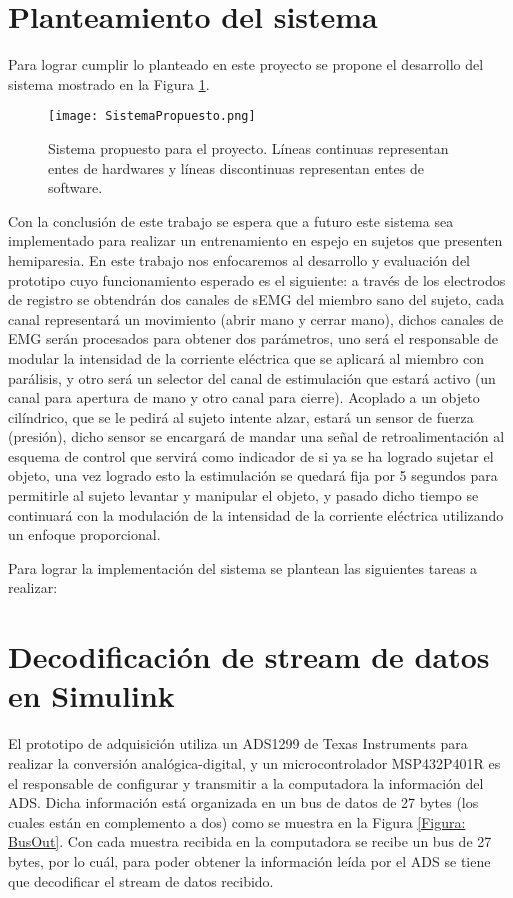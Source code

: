 \section{{\color{red}Planteamiento del sistema}}
Para lograr cumplir lo planteado en este proyecto se propone el desarrollo del sistema mostrado en la Figura \ref{Figura: SistProp}.

\begin{figure}[htbp]
\centering
	\texttt{[image: SistemaPropuesto.png]}
	\caption{Sistema propuesto para el proyecto. Líneas continuas representan entes de hardwares y líneas discontinuas representan entes de software.}
	\label{Figura: SistProp}
\end{figure}

Con la conclusión de este trabajo se espera que a futuro este sistema sea implementado para realizar un entrenamiento en espejo en sujetos que presenten hemiparesia. En este trabajo nos enfocaremos al desarrollo y evaluación del prototipo cuyo funcionamiento esperado es el siguiente: a través de los electrodos de registro se obtendrán dos canales de sEMG del miembro sano del sujeto, cada canal representará un movimiento (abrir mano y cerrar mano), dichos canales de EMG serán procesados para obtener dos parámetros, uno será el responsable de modular la intensidad de la corriente eléctrica que se aplicará al miembro con parálisis, y otro será un selector del canal de estimulación que estará activo (un canal para apertura de mano y otro canal para cierre). Acoplado a un objeto cilíndrico, que se le pedirá al sujeto intente alzar, estará un sensor de fuerza (presión), dicho sensor se encargará de mandar una señal de retroalimentación al esquema de control que servirá como indicador de si ya se ha logrado sujetar el objeto, una vez logrado esto la estimulación se quedará fija por 5 segundos para permitirle al sujeto levantar y manipular el objeto, y pasado dicho tiempo se continuará con la modulación de la intensidad de la corriente eléctrica utilizando un enfoque proporcional.

Para lograr la implementación del sistema se plantean las siguientes tareas a realizar:

\section{Decodificación de stream de datos en Simulink}
El prototipo de adquisición utiliza un ADS1299 de Texas Instruments para realizar la conversión analógica-digital, y un microcontrolador MSP432P401R es el responsable de configurar y transmitir a la computadora la información del ADS. Dicha información está organizada en un bus de datos de 27 bytes (los cuales están en complemento a dos) como se muestra en la Figura \ref{Figura: BusOut}. Con cada muestra recibida en la computadora se recibe un bus de 27 bytes, por lo cuál, para poder obtener la información leída por el ADS se tiene que decodificar el stream de datos recibido.


